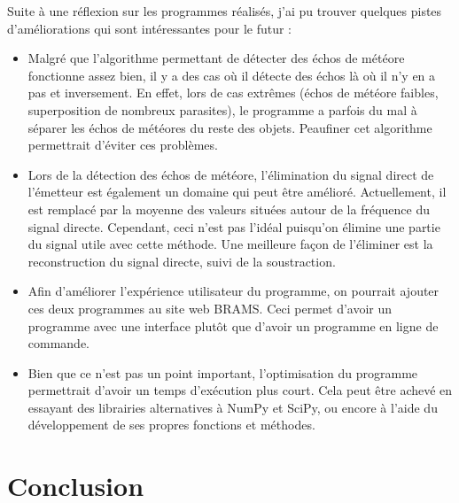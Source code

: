 \documentclass[11pt]{article}
\begin{document}
Suite à une réflexion sur les programmes réalisés, j'ai pu trouver quelques pistes d'améliorations qui sont intéressantes pour le futur :
\begin{itemize}
    \item Malgré que l'algorithme permettant de détecter des échos de météore fonctionne assez bien, il y a des cas où il détecte des échos là où il n'y en a pas et inversement.
          En effet, lors de cas extrêmes (échos de météore faibles, superposition de nombreux parasites), le programme a parfois du mal à séparer les échos de météores du reste des objets.
          Peaufiner cet algorithme permettrait d'éviter ces problèmes.
    \item Lors de la détection des échos de météore, l'élimination du signal direct de l'émetteur est également un domaine qui peut être amélioré.
          Actuellement, il est remplacé par la moyenne des valeurs situées autour de la fréquence du signal directe.
          Cependant, ceci n'est pas l'idéal puisqu'on élimine une partie du signal utile avec cette méthode.
          Une meilleure façon de l'éliminer est la reconstruction du signal directe, suivi de la soustraction.
    \item Afin d'améliorer l'expérience utilisateur du programme, on pourrait ajouter ces deux programmes au site web BRAMS.
          Ceci permet d'avoir un programme avec une interface plutôt que d'avoir un programme en ligne de commande.
    \item Bien que ce n'est pas un point important, l'optimisation du programme permettrait d'avoir un temps d'exécution plus court.
          Cela peut être achevé en essayant des librairies alternatives à NumPy et SciPy, ou encore à l'aide du développement de ses propres fonctions et méthodes.
\end{itemize}

\newpage

\section{Conclusion}
\end{document}
